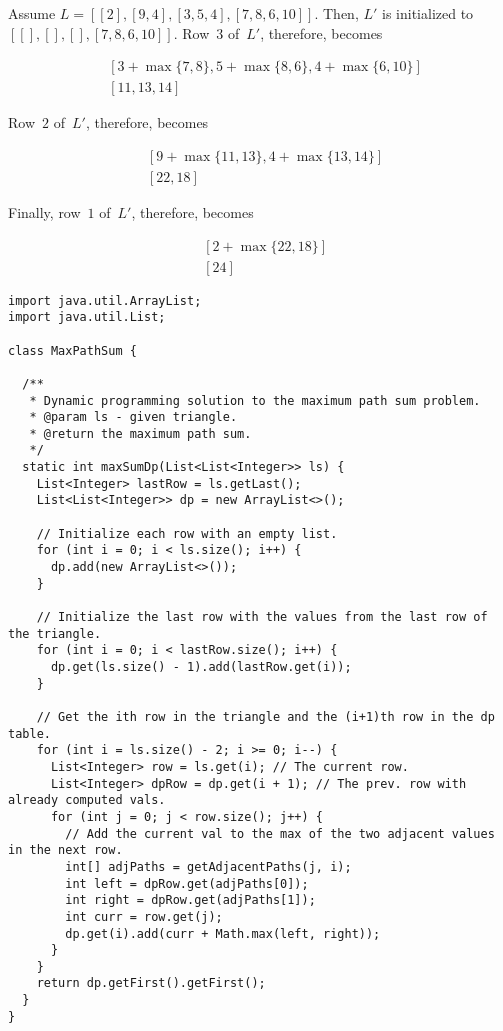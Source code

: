 Assume $L=[[2], [9, 4], [3, 5, 4], [7, 8, 6, 10]]$. 
Then, $L'$ is initialized to $[[], [], [], [7, 8, 6, 10]]$.
Row~$3$ of~$L'$, therefore, becomes

\begin{align*}
  & [3 + \max\{7, 8\}, 5 + \max\{8, 6\}, 4 + \max\{6, 10\}]\\
  & [11, 13, 14]
\end{align*}

\noindent Row~$2$ of~$L'$, therefore, becomes

\begin{align*}
  & [9 + \max\{11, 13\}, 4 + \max\{13, 14\}]\\
  & [22, 18]  
\end{align*}

\noindent Finally, row~$1$ of~$L'$, therefore, becomes

\begin{align*}
  & [2 + \max\{22, 18\}]\\
  & [24]
\end{align*}

\begin{lstlisting}[language=MyJava]
import java.util.ArrayList;
import java.util.List;

class MaxPathSum {

  /**
   * Dynamic programming solution to the maximum path sum problem.
   * @param ls - given triangle.
   * @return the maximum path sum.
   */
  static int maxSumDp(List<List<Integer>> ls) {
    List<Integer> lastRow = ls.getLast();
    List<List<Integer>> dp = new ArrayList<>();

    // Initialize each row with an empty list.
    for (int i = 0; i < ls.size(); i++) {
      dp.add(new ArrayList<>());
    }

    // Initialize the last row with the values from the last row of the triangle.
    for (int i = 0; i < lastRow.size(); i++) {
      dp.get(ls.size() - 1).add(lastRow.get(i));
    }

    // Get the ith row in the triangle and the (i+1)th row in the dp table.
    for (int i = ls.size() - 2; i >= 0; i--) {
      List<Integer> row = ls.get(i); // The current row.
      List<Integer> dpRow = dp.get(i + 1); // The prev. row with already computed vals.
      for (int j = 0; j < row.size(); j++) {
        // Add the current val to the max of the two adjacent values in the next row.
        int[] adjPaths = getAdjacentPaths(j, i);
        int left = dpRow.get(adjPaths[0]);
        int right = dpRow.get(adjPaths[1]);
        int curr = row.get(j);
        dp.get(i).add(curr + Math.max(left, right));
      }
    }
    return dp.getFirst().getFirst();
  }
}
\end{lstlisting}


